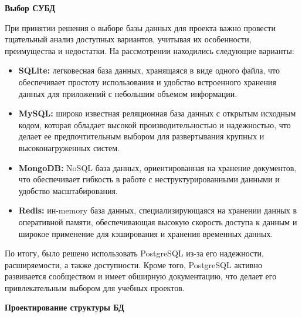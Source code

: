 \documentclass[12pt, russian]{extarticle}
\begin{document}
\begin{spacing}{1.5}
\par \noindent \textbf{Выбор СУБД}


При принятии решения о выборе базы данных для проекта важно провести тщательный анализ доступных вариантов, учитывая их особенности, преимущества и недостатки. На рассмотрении находились следующие варианты:


\begin{itemize}
    \item \textbf{SQLite:} легковесная база данных, хранящаяся в виде одного файла, что обеспечивает простоту использования и удобство встроенного хранения данных для приложений с небольшим объемом информации.
    \item \textbf{MySQL:} широко известная реляционная база данных с открытым исходным кодом, которая обладает высокой производительностью и надежностью, что делает ее предпочтительным выбором для развертывания крупных и высоконагруженных систем.
    \item \textbf{MongoDB:} NoSQL база данных, ориентированная на хранение документов, что обеспечивает гибкость в работе с неструктурированными данными и удобство масштабирования.
    \item \textbf{Redis:} ин-memory база данных, специализирующаяся на хранении данных в оперативной памяти, обеспечивающая высокую скорость доступа к данным и широкое применение для кэширования и хранения временных данных.
\end{itemize}

По итогу, было решено использовать PostgreSQL из-за его надежности, расширяемости, а также доступности.
Кроме того, PostgreSQL активно развивается сообществом и имеет обширную документацию,
что делает его привлекательным выбором для учебных проектов.

\par \noindent \textbf{Проектирование структуры БД}


\end{spacing}
\end{document}
